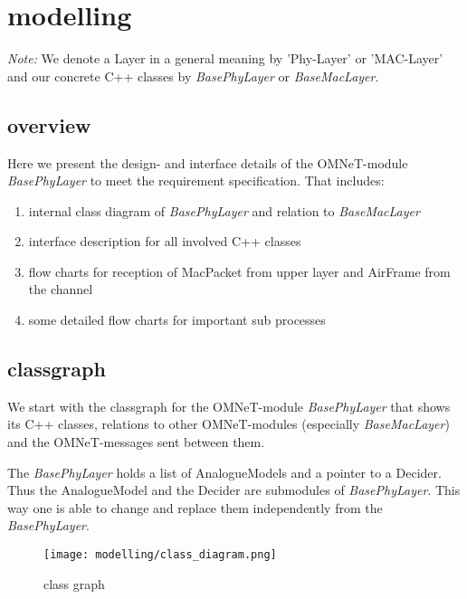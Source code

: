 \newcommand{\h}[1]{\textit{#1}}
\newcommand{\bp}{BasePhyLayer}
\newcommand{\bm}{BaseMacLayer}


\section{modelling}

\emph{Note: }We denote a Layer in a general meaning by 'Phy-Layer' 
or 'MAC-Layer' and our concrete C++ classes by \h{\bp} or \h{\bm}.


\subsection{overview}

Here we present the design- and interface details of the OMNeT-module 
\h{\bp} to meet the requirement specification. That includes:

\begin{enumerate}
 \item internal class diagram of \h{\bp} and relation to \h{\bm}
 \item interface description for all involved C++ classes
 \item flow charts for reception of MacPacket from upper layer and 
 AirFrame from the channel
 \item some detailed flow charts for important sub processes
\end{enumerate}


\subsection{classgraph}

We start with the classgraph for the OMNeT-module \h{\bp} that shows 
its C++ classes, relations to other OMNeT-modules (especially \h{\bm})
and the OMNeT-messages sent between them.

The \h{\bp} holds a list of AnalogueModels and a pointer to a Decider. Thus the AnalogueModel and the Decider are submodules of \h{\bp}. This way one is able to change and replace them independently from the \h{\bp}.

\begin{figure}[H]
 \centering
 \texttt{[image: modelling/class\_diagram.png]}
 \caption{class graph}
 \label{fig: classgraph}
\end{figure}


